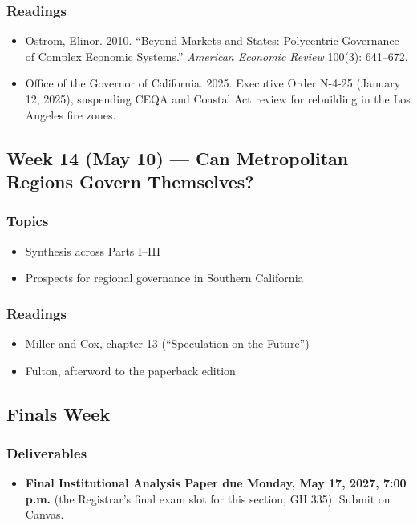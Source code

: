 \documentclass[12pt]{article}
\begin{document}
    \subsubsection*{Readings}
        \begin{itemize}
            \item Ostrom, Elinor. 2010. ``Beyond Markets and States: Polycentric Governance of Complex Economic Systems.'' \emph{American Economic Review} 100(3): 641--672.
            \item Office of the Governor of California. 2025. Executive Order N-4-25 (January 12, 2025), suspending CEQA and Coastal Act review for rebuilding in the Los Angeles fire zones.
        \end{itemize}

\subsection*{Week 14 (May 10) --- Can Metropolitan Regions Govern Themselves?}
    \subsubsection*{Topics}
        \begin{itemize}
            \item Synthesis across Parts I--III
            \item Prospects for regional governance in Southern California
        \end{itemize}
    \subsubsection*{Readings}
        \begin{itemize}
            \item Miller and Cox, chapter 13 (``Speculation on the Future'')
            \item Fulton, afterword to the paperback edition
        \end{itemize}

\subsection*{Finals Week}
    \subsubsection*{Deliverables}
        \begin{itemize}
            \item \textbf{Final Institutional Analysis Paper due Monday, May 17, 2027, 7:00 p.m.} (the Registrar's final exam slot for this section, GH 335). Submit on Canvas.
        \end{itemize}
\end{document}
